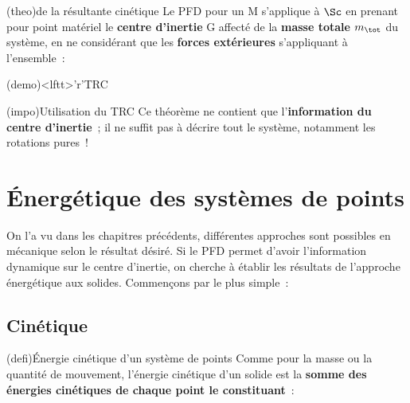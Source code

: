 \documentclass[../../main/main.tex]{subfiles}
\begin{document}
\begin{tcbraster}[raster columns=2, raster equal height=rows, raster
		valign=top]%
	\begin{tcb*}(theo){de la résultante cinétique}
		Le PFD pour un M s'applique à $\Sc$ en prenant pour point matériel le
		\textbf{centre d'inertie} G affecté de la \textbf{masse totale} $m_{\tot}$
		du système, en ne considérant que les \textbf{forces extérieures}
		s'appliquant à l'ensemble~:
		\psw{
			\[
				\boxed{\dv{\pf\Rg(\Sc)}{t} = m_{\tot}\dv{\vf(\Gr)}{t} = \Ff_{\ext}}
			\]
		}
		\vspace{-15pt}
	\end{tcb*}%
	\begin{tcb*}(demo)<lftt>'r'{TRC}
	\end{tcb*}
\end{tcbraster}
\begin{tcb*}(impo){Utilisation du TRC}
	Ce théorème ne contient que l'\textbf{information du centre d'inertie}~; il ne
	suffit pas à décrire tout le système, notamment les rotations pures~!
\end{tcb*}

\section{Énergétique des systèmes de points}
On l'a vu dans les chapitres précédents, différentes approches sont possibles en
mécanique selon le résultat désiré. Si le PFD permet d'avoir l'information
dynamique sur le centre d'inertie, on cherche à établir les résultats de
l'approche énergétique aux solides. Commençons par le plus simple~:
\subsection{Cinétique}
\begin{tcb*}(defi){Énergie cinétique d'un système de points}
	Comme pour la masse ou la quantité de mouvement, l'énergie cinétique d'un
	solide est la \textbf{somme des énergies cinétiques de chaque point le
		constituant}~:
	\psw{
	\[
		\boxed{\Ec_{c/\Rc}(\Sc) = \sum_i\Ec_{c/\Rc}(\Mr_i) = \sum_i
		\frac{1}{2}m_iv_{i/\Rc}{}^2}
	\]
	}
	\vspace{-15pt}
\end{tcb*}
\end{document}
